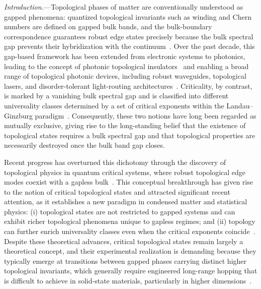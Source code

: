 \documentclass[aps,prl,twocolumn,preprintnumbers,amsmath,amssymb,superscriptaddress,10pt]{revtex4-2}
\begin{document}
\emph{Introduction.}---Topological phases of matter are conventionally understood as gapped phenomena: quantized topological invariants such as winding and Chern numbers are defined on gapped bulk bands, and the bulk-boundary correspondence guarantees robust edge states precisely because the bulk spectral gap prevents their hybridization with the continuum~\cite{HasanKane2010,QiZhang2011,ChiuTeo2016}. Over the past decade, this gap-based framework has been extended from electronic systems to photonics, leading to the concept of photonic topological insulators~\cite{Ozawa2019,Lu2014,Leykam2026,Nori2015Science,PhysRevLett.128.203602,PhysRevLett.128.203602,khanikaev2017two,khanikaev2013photonic,PhysRevLett.134.223806,PhysRevLett.120.250501,bliokh2019topological,PhysRevB.102.045129,PhysRevB.102.134213,khanikaev2024topological,vakulenko2023adiabatic,leefmans2022topological} and enabling a broad range of topological photonic devices, including robust waveguides, topological lasers, and disorder-tolerant light-routing architectures~\cite{amelio2020theory,harari2018topological,bandres2018topological,yang2022topological,lu2021topological,PhysRevLett.134.203803,leefmans2024topological,kumar2025emission,barik2018topological,price2022roadmap}. Criticality, by contrast, is marked by a vanishing bulk spectral gap and is classified into different universality classes determined by a set of critical exponents within the Landau–Ginzburg paradigm~\cite{Sachdev2011,Cardy1996}. Consequently, these two notions have long been regarded as mutually exclusive, giving rise to the long-standing belief that the existence of topological states requires a bulk spectral gap and that topological properties are necessarily destroyed once the bulk band gap closes.

Recent progress has overturned this dichotomy through the discovery of topological physics in quantum critical systems, where robust topological edge modes coexist with a gapless bulk~\cite{Scaffidi2017,Verresen2018,Verresen2021,Yu2022PRL,YuXuLin2026,PhysRevB.103.L100207,verresen2020,PhysRevLett.129.210601,PhysRevB.106.144436,PhysRevLett.133.026601,cv5q-8t25,nj3d-8g9s,PhysRevLett.134.116602,PhysRevB.97.165114}. This conceptual breakthrough has given rise to the notion of critical topological states and attracted significant recent attention, as it establishes a new paradigm in condensed matter and statistical physics: (i) topological states are not restricted to gapped systems and can exhibit richer topological phenomena unique to gapless regimes; and (ii) topology can further enrich universality classes even when the critical exponents coincide~\cite{YuXuLin2026}. Despite these theoretical advances, critical topological states remain largely a theoretical concept, and their experimental realization is demanding because they typically emerge at transitions between gapped phases carrying distinct higher topological invariants, which generally require engineered long-range hopping that is difficult to achieve in solid-state materials, particularly in higher dimensions~\cite{zhou2025topological}.
\end{document}

